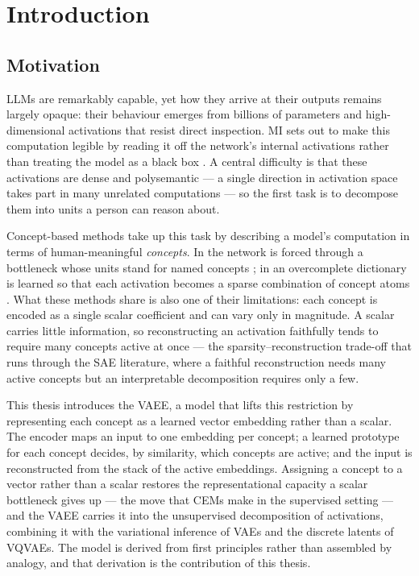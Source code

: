 \chapter{Introduction}\label{ch:intro}

\section{Motivation} \label{sec:intro:motivation}

\Acp{LLM} are remarkably capable, yet how they arrive at their
outputs remains largely opaque: their behaviour emerges from billions of
parameters and high-dimensional activations that resist direct inspection.
\Acl{MI} sets out to make this computation legible
by reading it off the network's internal activations rather than treating the
model as a black box \citep{olahZoomIntroductionCircuits2020,
elhageMathematicalFrameworkTransformer2021}. A central difficulty is that these
activations are dense and polysemantic --- a single direction in activation
space takes part in many unrelated computations --- so the first task is to
decompose them into units a person can reason about.

Concept-based methods take up this task by describing a model's computation in
terms of human-meaningful \textit{concepts}. In  the network is forced
through a bottleneck whose units stand for named concepts
\citep{kohConceptBottleneckModels2020}; in  an overcomplete dictionary
is learned so that each activation becomes a sparse combination of concept atoms
\citep{brickenMonosemanticityDecomposingLanguage2023,
templetonScalingMonosemanticityExtracting}. What these methods share is also one
of their limitations: each concept is encoded as a single scalar coefficient and
can vary only in magnitude. A scalar carries little information, so
reconstructing an activation faithfully tends to require many concepts active at
once --- the sparsity--reconstruction trade-off that runs through the \ac{SAE}
literature, where a faithful reconstruction needs many active concepts but an
interpretable decomposition requires only a few.

This thesis introduces the \ac{VAEE}, a model that lifts this restriction by
representing each concept as a learned vector embedding rather than a scalar.
The encoder maps an input to one embedding per concept; a learned prototype for
each concept decides, by similarity, which concepts are active; and the input is
reconstructed from the stack of the active embeddings. Assigning a concept to a
vector rather than a scalar restores the representational capacity a scalar
bottleneck gives up --- the move that \aclp{CEM} make in the supervised setting
\citep{espinosazarlengaConceptEmbeddingModels2022} --- and the \ac{VAEE} carries
it into the unsupervised decomposition of activations, combining it with the
variational inference of \acp{VAE} and the discrete latents of \acp{VQVAE}. The
model is derived from first principles rather than assembled by analogy, and
that derivation is the contribution of this thesis.

